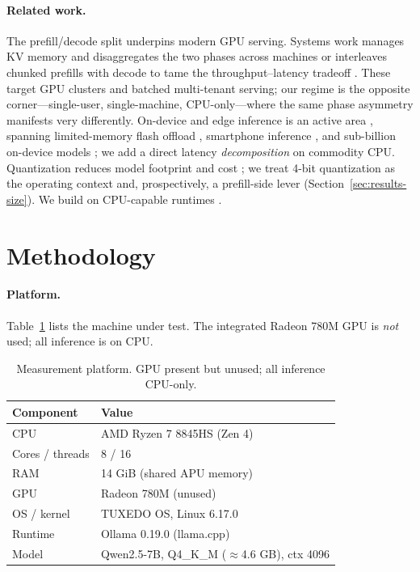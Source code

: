 \documentclass[10pt,twocolumn]{article}
\begin{document}
\paragraph{Related work.}
The prefill/decode split underpins modern GPU serving. Systems work
manages KV memory \cite{kwon2023pagedattention} and disaggregates the two
phases across machines \cite{patel2024splitwise, zhong2024distserve} or
interleaves chunked prefills with decode to tame the throughput--latency
tradeoff \cite{agrawal2024sarathi}. These target GPU clusters and batched
multi-tenant serving; our regime is the opposite corner---single-user,
single-machine, CPU-only---where the same phase asymmetry manifests very
differently. On-device and edge inference is an active area
\cite{xu2024ondevicereview}, spanning limited-memory flash offload
\cite{alizadeh2024llmflash}, smartphone inference \cite{xue2024powerinfer2},
and sub-billion on-device models \cite{liu2024mobilellm}; we add a direct
latency \emph{decomposition} on commodity CPU. Quantization reduces model
footprint and cost \cite{dettmers2022llmint8, frantar2023gptq,
xiao2023smoothquant, lin2024awq}; we treat 4-bit quantization as the
operating context and, prospectively, a prefill-side lever
(Section~\ref{sec:results-size}). We build on CPU-capable runtimes
\cite{gerganov2023llamacpp, shen2023efficientcpu}.

\section{Methodology}
\label{sec:method}

\paragraph{Platform.}
Table~\ref{tab:hardware} lists the machine under test. The integrated
Radeon 780M GPU is \emph{not} used; all inference is on CPU.

\begin{table}[t]
  \centering
  \caption{Measurement platform. GPU present but unused; all inference CPU-only.}
  \label{tab:hardware}
  \begin{tabular}{ll}
    \toprule
    Component & Value \\
    \midrule
    CPU            & AMD Ryzen 7 8845HS (Zen 4) \\
    Cores / threads& 8 / 16 \\
    RAM            & 14 GiB (shared APU memory) \\
    GPU            & Radeon 780M (unused) \\
    OS / kernel    & TUXEDO OS, Linux 6.17.0 \\
    Runtime        & Ollama 0.19.0 (llama.cpp) \\
    Model          & Qwen2.5-7B, Q4\_K\_M ($\approx$4.6 GB), ctx 4096 \\
    \bottomrule
  \end{tabular}
\end{table}
\end{document}
